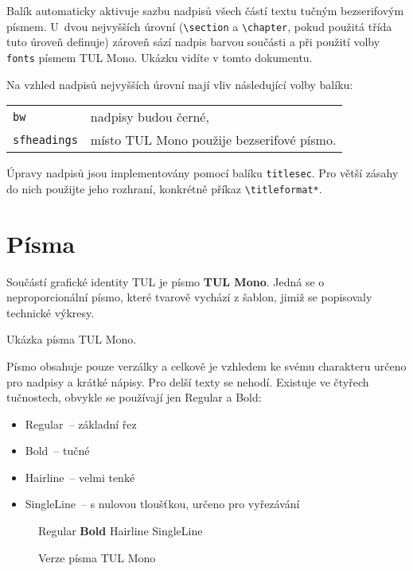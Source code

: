 \documentclass[a4paper,12pt,twoside,FP]{article}
\newcommand{\cmdfont}[1]{\texttt{\color{\tulcolor}#1}}
\newcommand{\cmdnoindex}[1]{\cmdfont{\textbackslash #1}}
\begin{document}
Balík automaticky aktivuje sazbu nadpisů všech částí textu tučným bezserifovým
písmem. U~dvou nejvyšších úrovní (\cmdnoindex{section} a \cmdnoindex{chapter},
pokud použitá třída tuto úroveň definuje) zároveň sází nadpis barvou součásti a
při použití volby \cmdfont{fonts} písmem TUL Mono. Ukázku vidíte v tomto
dokumentu.

Na vzhled nadpisů nejvyšších úrovní mají vliv následující volby balíku:

\begin{tabularx}{\textwidth}{@{}lX}
\cmdfont{bw} & nadpisy budou černé,\\
\cmdfont{sfheadings} & místo TUL Mono použije bezserifové písmo.\\
\end{tabularx}

Úpravy nadpisů jsou implementovány pomocí balíku \cmdfont{titlesec}. Pro větší
zásahy do nich použijte jeho rozhraní, konkrétně příkaz
\cmdnoindex{titleformat*}.


\section{Písma}\label{pisma}

Součástí grafické identity TUL je písmo \textbf{TUL Mono}. Jedná se o
neproporcionální písmo, které tvarově vychází z šablon, jimiž se
popisovaly technické výkresy.

{\TULmono Ukázka písma TUL Mono.}

Písmo obsahuje pouze verzálky a celkově je vzhledem ke svému charakteru určeno
pro nadpisy a krátké nápisy. Pro delší texty se nehodí. Existuje ve čtyřech
tučnostech, obvykle se používají jen Regular a Bold:

\begin{itemize}\setlength{\itemsep}{0pt}
\item Regular~-- základní řez
\item Bold~-- tučné
\item Hairline~-- velmi tenké
\item SingleLine~-- s nulovou tloušťkou, určeno pro vyřezávání
\end{itemize}

\begin{figure}[htp]
\begin{center}
{\TULmono Regular \textbf{Bold} \TULmonoHairline Hairline
\TULmonoSingleline SingleLine}\\
\end{center}
\caption{Verze písma TUL Mono}
\label{tul-mono}
\end{figure}
\end{document}

